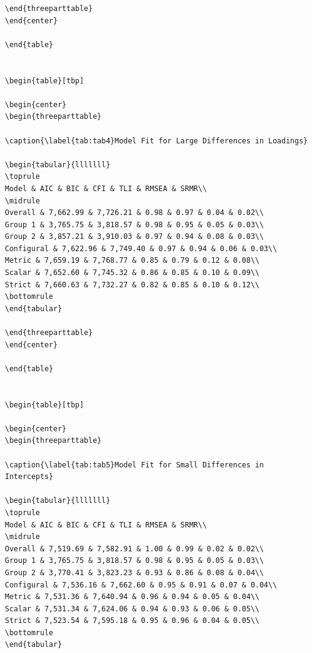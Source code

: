 \documentclass[
  man]{apa6}
\begin{document}
\begin{verbatim}
\end{threeparttable}
\end{center}

\end{table}


\begin{table}[tbp]

\begin{center}
\begin{threeparttable}

\caption{\label{tab:tab4}Model Fit for Large Differences in Loadings}

\begin{tabular}{lllllll}
\toprule
Model & AIC & BIC & CFI & TLI & RMSEA & SRMR\\
\midrule
Overall & 7,662.99 & 7,726.21 & 0.98 & 0.97 & 0.04 & 0.02\\
Group 1 & 3,765.75 & 3,818.57 & 0.98 & 0.95 & 0.05 & 0.03\\
Group 2 & 3,857.21 & 3,910.03 & 0.97 & 0.94 & 0.08 & 0.03\\
Configural & 7,622.96 & 7,749.40 & 0.97 & 0.94 & 0.06 & 0.03\\
Metric & 7,659.19 & 7,768.77 & 0.85 & 0.79 & 0.12 & 0.08\\
Scalar & 7,652.60 & 7,745.32 & 0.86 & 0.85 & 0.10 & 0.09\\
Strict & 7,660.63 & 7,732.27 & 0.82 & 0.85 & 0.10 & 0.12\\
\bottomrule
\end{tabular}

\end{threeparttable}
\end{center}

\end{table}


\begin{table}[tbp]

\begin{center}
\begin{threeparttable}

\caption{\label{tab:tab5}Model Fit for Small Differences in Intercepts}

\begin{tabular}{lllllll}
\toprule
Model & AIC & BIC & CFI & TLI & RMSEA & SRMR\\
\midrule
Overall & 7,519.69 & 7,582.91 & 1.00 & 0.99 & 0.02 & 0.02\\
Group 1 & 3,765.75 & 3,818.57 & 0.98 & 0.95 & 0.05 & 0.03\\
Group 2 & 3,770.41 & 3,823.23 & 0.93 & 0.86 & 0.08 & 0.04\\
Configural & 7,536.16 & 7,662.60 & 0.95 & 0.91 & 0.07 & 0.04\\
Metric & 7,531.36 & 7,640.94 & 0.96 & 0.94 & 0.05 & 0.04\\
Scalar & 7,531.34 & 7,624.06 & 0.94 & 0.93 & 0.06 & 0.05\\
Strict & 7,523.54 & 7,595.18 & 0.95 & 0.96 & 0.04 & 0.05\\
\bottomrule
\end{tabular}


\end{verbatim}
\end{document}

